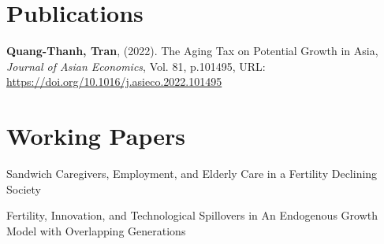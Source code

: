 \section{\sc Publications}
\begin{etaremune}[]
\item
  {\bf Quang-Thanh, Tran},
  (2022).
  {The Aging Tax on Potential Growth in Asia},
  {\it Journal of Asian Economics}, Vol. 81, p.101495,
  {URL: \url{https://doi.org/10.1016/j.asieco.2022.101495}}
\end{etaremune}

\vspace{4mm}

\section{\sc Working Papers}
\begin{etaremune}[]
\item
  {Sandwich Caregivers, Employment, and Elderly Care in a Fertility Declining Society}
 \item
  {Fertility, Innovation, and Technological Spillovers  in An Endogenous Growth Model with Overlapping Generations} 
\end{etaremune}


